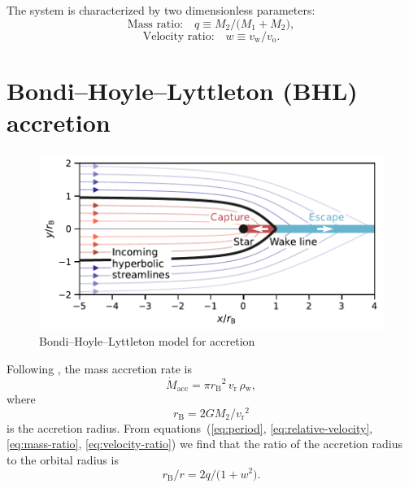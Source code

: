\documentclass[useAMS, usenatbib, a4paper]{mnras}
\newcommand\wind{\ensuremath{_{\mathrm{w}}}}
\newcommand\orb{\ensuremath{_{\mathrm{o}}}}
\newcommand\rel{\ensuremath{_{\mathrm{r}}}}
\newcommand\bhl{\ensuremath{_{\mathrm{\scriptscriptstyle B}}}}
\newcommand\acc{\ensuremath{_{\mathrm{acc}}}}
\newcommand\mdacc{\ensuremath{\dot M\acc}}
\begin{document}
The system is characterized by two dimensionless parameters:
\begin{equation}
  \label{eq:mass-ratio}
  \text{Mass ratio:}\quad q \equiv M_2 / \bigl(M_1 + M_2\bigr),
\end{equation}
\begin{equation}
  \label{eq:velocity-ratio}
  \text{Velocity ratio:}\quad w \equiv v\wind / v\orb.
\end{equation}

\section{Bondi--Hoyle--Lyttleton (BHL) accretion}
\label{sec:bondi-hoyle-lyttl}

\begin{figure}
  \centering
  \includegraphics[width=\linewidth]{notebooks/hoyle-lyttleton-trajectories}
  \caption{Bondi--Hoyle--Lyttleton model for accretion}
  \label{fig:bhl}
\end{figure}
Following \citet{Hoyle:1939a, Bondi:1944a},
the mass accretion rate is
\begin{equation}
  \label{eq:mdot-bhl}
  \mdacc = \pi r\bhl^2 \, v\rel \, \rho\wind , 
\end{equation}
where
\begin{equation}
  \label{eq:radius-bhl}
  r\bhl = 2 G M_2 / v\rel^2 
\end{equation}
is the accretion radius.
From equations~(\ref{eq:period}, \ref{eq:relative-velocity}, \ref{eq:mass-ratio}, \ref{eq:velocity-ratio}) we find that the ratio of the accretion radius to the orbital radius is
\begin{equation}
  \label{eq:racc-over-r}
  r\bhl / r = 2 q / \bigl(1 + w^2\bigr).
\end{equation}
\end{document}
